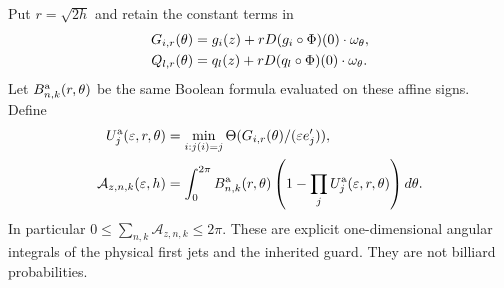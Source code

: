 Put $r=\sqrt{2h}$ and retain the constant terms in
\begin{align}\label{eq:v65-affine-margins}
 G_{i,r}(\theta)&=g_i(z)+rD(g_i\circ\Phi)(0)\cdot\omega_\theta,
                                      \notag\\
 Q_{l,r}(\theta)&=q_l(z)+rD(q_l\circ\Phi)(0)\cdot\omega_\theta.
\end{align}
Let $B_{n,k}^{\rm a}(r,\theta)$ be the same Boolean formula evaluated
on these affine signs. Define
\begin{align}\label{eq:v65-affine-profile}
 U_j^{\rm a}(\varepsilon,r,\theta)
   &=\min_{i:j(i)=j}\Theta(G_{i,r}(\theta)/(\varepsilon e'_j)),
                                      \notag\\
 \mathcal A_{z,n,k}(\varepsilon,h)
   &=\int_0^{2\pi}B_{n,k}^{\rm a}(r,\theta)
           \left(1-\prod_jU_j^{\rm a}(\varepsilon,r,\theta)\right)d\theta.
\end{align}
In particular $0\le\sum_{n,k}\mathcal A_{z,n,k}\le2\pi$.
These are explicit one-dimensional angular integrals of the physical
first jets and the inherited guard. They are not billiard probabilities.

